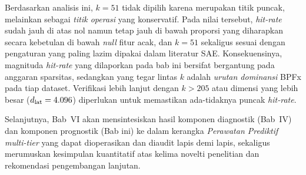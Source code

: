 {\color{blue}Berdasarkan analisis ini, $k = 51$ tidak dipilih karena
merupakan titik puncak, melainkan sebagai \emph{titik operasi} yang
konservatif. Pada nilai tersebut, \emph{hit-rate} sudah jauh di atas nol
namun tetap jauh di bawah proporsi yang diharapkan secara kebetulan di
bawah \emph{null} fitur acak, dan $k = 51$ sekaligus sesuai dengan
pengaturan yang paling lazim dipakai dalam literatur SAE.}
{\color{blue}Konsekuensinya, magnituda \emph{hit-rate} yang dilaporkan
pada bab ini bersifat bergantung pada anggaran sparsitas, sedangkan yang
tegar lintas $k$ adalah \emph{urutan dominansi} BPFx pada tiap dataset.
Verifikasi lebih lanjut dengan $k > 205$ atau dimensi yang lebih besar
($d_{\rm lat} = 4.096$) diperlukan untuk memastikan ada-tidaknya puncak
\emph{hit-rate}.}

Selanjutnya, Bab~VI akan mensintesiskan hasil {\color{blue}komponen diagnostik} (Bab~IV) dan {\color{blue}komponen prognostik} (Bab ini)
ke dalam kerangka \emph{Perawatan Prediktif multi-tier} yang dapat
dioperasikan dan diaudit lapis demi lapis, sekaligus merumuskan
kesimpulan kuantitatif atas kelima novelti penelitian dan rekomendasi
pengembangan lanjutan.
